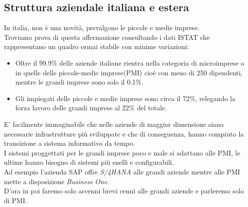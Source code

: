 \documentclass{book}
\begin{document}
    \subsection{Struttura aziendale italiana e estera}
    In italia, non è una novità, prevalgono le piccole e medie imprese.\\
    Troviamo prova di questa affermazione consultando i dati ISTAT che rappresentano un quadro ormai stabile con minime variazioni:
    \begin{itemize}
        \item Oltre il 99.9\% delle aziende italiane rientra nella categoria di microimprese o in quelle delle piccole-medie imprese(PMI) cioè con meno di 250 dipendenti, mentre le grandi imprese sono solo il 0.1\%.
        \item Gli impiegati delle piccole e medie imprese sono circa il 72\%, relegando la forza lavoro delle grandi imprese al 22\% del totale.
    \end{itemize}
    E' facilmente immaginabile che nelle aziende di maggior dimensione siano necessarie infrastrutture più sviluppate e che di conseguenza, hanno compiuto la transizione a sistema informativo da tempo.\\
    I sistemi proggettati per le grandi imprese poco e male si adattano alle PMI, le ultime hanno bisogno di sistemi più snelli e configurabili.\\
    Ad esempio l'azienda SAP offre \emph{S/4HANA} alle grandi aziende mentre alle PMI mette a disposizione \emph{Business One}.\\
    D'ora in poi faremo solo accenni brevi cenni alle grandi aziende e parleremo solo di PMI.
\end{document}
